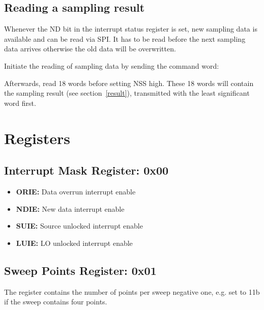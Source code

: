 \documentclass{article}
\newcommand{\bitrect}[2]{
  \begin{pgfonlayer}{foreground}
    \draw [thick] (0,0) rectangle (#1,1);
    \pgfmathsetmacro\result{#1-1}
    \foreach \x in {1,...,\result}
      \draw [thick] (\x,1) -- (\x, 0.8);
  \end{pgfonlayer}
  \bitlabels{#1}{#2}
}
\newcommand{\rwbits}[3]{
  \draw [thick] (#1,0) rectangle ++(#2,1) node[pos=0.5]{#3};
  \pgfmathsetmacro\start{#1+0.5}
  \pgfmathsetmacro\finish{#1+#2-0.5}
}
\newcommand{\robits}[3]{
  \begin{pgfonlayer}{background}
    \draw [thick, fill=lightgray] (#1,0) rectangle ++(#2,1) node[pos=0.5]{#3};
  \end{pgfonlayer}
  \pgfmathsetmacro\start{#1+0.5}
  \pgfmathsetmacro\finish{#1+#2-0.5}
}
\newcommand{\bitlabels}[2]{
  \foreach \bit in {1,...,#1}{
     \pgfmathsetmacro\result{#2}
     \node [above] at (\bit-0.5, 1) {\pgfmathprintnumber{\result}};
   }
}
\begin{document}
\subsection{Reading a sampling result}
Whenever the ND bit in the interrupt status register is set, new sampling data is available and can be read via SPI. It has to be read before the next sampling data arrives otherwise the old data will be overwritten.

Initiate the reading of sampling data by sending the command word:
\begin{center}
\end{center}
Afterwards, read 18 words before setting NSS high. These 18 words will contain the sampling result (see section~\ref{result}), transmitted with the least significant word first.

\section{Registers}
\subsection{Interrupt Mask Register: 0x00}
\begin{center}
\end{center}
\begin{itemize}
\item \textbf{ORIE:} Data overrun interrupt enable 
\item \textbf{NDIE:} New data interrupt enable
\item \textbf{SUIE:} Source unlocked interrupt enable
\item \textbf{LUIE:} LO unlocked interrupt enable 
\end{itemize}

\subsection{Sweep Points Register: 0x01}
\begin{center}
\end{center}
The register contains the number of points per sweep negative one, e.g. set to 11b if the sweep contains four points.
\end{document}
